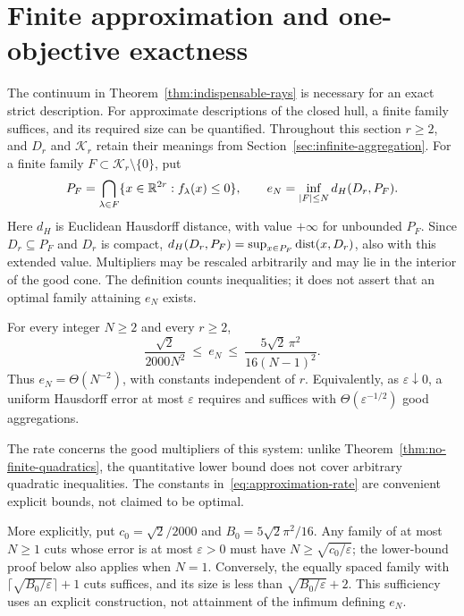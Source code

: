 \section{Finite approximation and one-objective exactness}
\label{sec:approximation}

The continuum in Theorem~\ref{thm:indispensable-rays} is necessary for
an exact strict description. For approximate descriptions of the closed
hull, a finite family suffices, and its required size can be quantified.
Throughout this section $r\geq2$, and $D_r$ and $\mathcal K_r$ retain
their meanings from Section~\ref{sec:infinite-aggregation}.
For a finite family $F\subset\mathcal K_r\setminus\{0\}$, put
\[
 P_F=\bigcap_{\lambda\in F}\{x\in\mathbb R^{2r}:f_\lambda(x)\leq0\},
 \qquad
 e_N=\inf_{|F|\leq N}d_H(D_r,P_F).
\]
Here $d_H$ is Euclidean Hausdorff distance, with value $+\infty$ for
unbounded $P_F$. Since $D_r\subseteq P_F$ and $D_r$ is compact,
$d_H(D_r,P_F)=\sup_{x\in P_F}\operatorname{dist}(x,D_r)$, also with this extended
value. Multipliers may be rescaled arbitrarily and may lie in the
interior of the good cone. The definition counts inequalities; it
does not assert that an optimal family attaining $e_N$ exists.

\begin{theorem}\label{thm:approximation-rate}
For every integer $N\geq2$ and every $r\geq2$,
\begin{equation}\label{eq:approximation-rate}
 \frac{\sqrt2}{2000N^2}
 \ \leq\ e_N\ \leq\
 \frac{5\sqrt2\,\pi^2}{16(N-1)^2}.
\end{equation}
Thus $e_N=\Theta(N^{-2})$, with constants independent of $r$.
Equivalently, as $\varepsilon\downarrow0$, a uniform Hausdorff
error at most $\varepsilon$ requires and suffices with
$\Theta(\varepsilon^{-1/2})$ good aggregations.
\end{theorem}

The rate concerns the good multipliers of this system: unlike
Theorem~\ref{thm:no-finite-quadratics}, the quantitative lower bound
does not cover arbitrary quadratic inequalities. The constants
in~\eqref{eq:approximation-rate} are convenient explicit bounds, not
claimed to be optimal.

More explicitly, put $c_0=\sqrt2/2000$ and
$B_0=5\sqrt2\pi^2/16$. Any family of at most $N\geq1$ cuts
whose error is at most $\varepsilon>0$ must have
$N\geq\sqrt{c_0/\varepsilon}$; the lower-bound proof below also
applies when $N=1$. Conversely, the equally spaced family with
$\lceil\sqrt{B_0/\varepsilon}\rceil+1$ cuts suffices, and its size
is less than $\sqrt{B_0/\varepsilon}+2$. This sufficiency uses an
explicit construction, not attainment of the infimum defining $e_N$.

